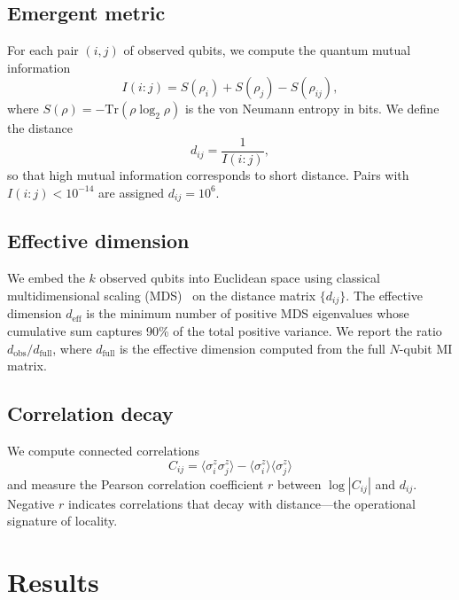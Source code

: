 \documentclass[aps,pra,twocolumn,superscriptaddress]{revtex4-2}
\begin{document}
\subsection{Emergent metric}

For each pair $(i,j)$ of observed qubits, we compute the quantum mutual information
\begin{equation}
I(i{:}j) = S(\rho_i) + S(\rho_j) - S(\rho_{ij}),
\label{eq:mi}
\end{equation}
where $S(\rho) = -\text{Tr}(\rho \log_2 \rho)$ is the von Neumann entropy in bits. We define the distance
\begin{equation}
d_{ij} = \frac{1}{I(i{:}j)},
\label{eq:distance}
\end{equation}
so that high mutual information corresponds to short distance. Pairs with $I(i{:}j) < 10^{-14}$ are assigned $d_{ij} = 10^6$.

\subsection{Effective dimension}

We embed the $k$ observed qubits into Euclidean space using classical multidimensional scaling (MDS)~\cite{borg2005} on the distance matrix $\{d_{ij}\}$. The effective dimension $d_\text{eff}$ is the minimum number of positive MDS eigenvalues whose cumulative sum captures 90\% of the total positive variance. We report the ratio $d_\text{obs}/d_\text{full}$, where $d_\text{full}$ is the effective dimension computed from the full $N$-qubit MI matrix.

\subsection{Correlation decay}

We compute connected correlations
\begin{equation}
C_{ij} = \langle \sigma^z_i \sigma^z_j \rangle - \langle \sigma^z_i \rangle \langle \sigma^z_j \rangle
\end{equation}
and measure the Pearson correlation coefficient $r$ between $\log|C_{ij}|$ and $d_{ij}$. Negative $r$ indicates correlations that decay with distance---the operational signature of locality.


\section{Results}
\label{sec:results}
\end{document}
